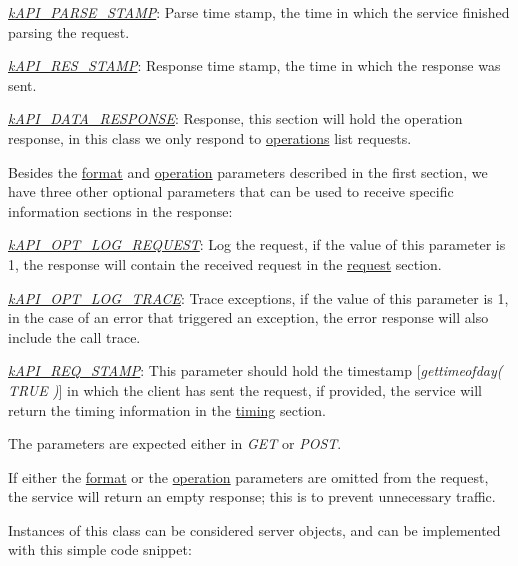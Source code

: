 \begin{DoxyItemize}
\begin{DoxyItemize}
\item {\itshape \hyperlink{}{k\-A\-P\-I\-\_\-\-P\-A\-R\-S\-E\-\_\-\-S\-T\-A\-M\-P}}\-: Parse time stamp, the time in which the service finished parsing the request. 
\item {\itshape \hyperlink{}{k\-A\-P\-I\-\_\-\-R\-E\-S\-\_\-\-S\-T\-A\-M\-P}}\-: Response time stamp, the time in which the response was sent. 
\end{DoxyItemize}
\item {\itshape \hyperlink{}{k\-A\-P\-I\-\_\-\-D\-A\-T\-A\-\_\-\-R\-E\-S\-P\-O\-N\-S\-E}}\-: Response, this section will hold the operation response, in this class we only respond to \hyperlink{}{operations} list requests. 
\end{DoxyItemize}

Besides the \hyperlink{}{format} and \hyperlink{}{operation} parameters described in the first section, we have three other optional parameters that can be used to receive specific information sections in the response\-:


\begin{DoxyItemize}
\item {\itshape \hyperlink{}{k\-A\-P\-I\-\_\-\-O\-P\-T\-\_\-\-L\-O\-G\-\_\-\-R\-E\-Q\-U\-E\-S\-T}}\-: Log the request, if the value of this parameter is 1, the response will contain the received request in the \hyperlink{}{request} section. 
\item {\itshape \hyperlink{}{k\-A\-P\-I\-\_\-\-O\-P\-T\-\_\-\-L\-O\-G\-\_\-\-T\-R\-A\-C\-E}}\-: Trace exceptions, if the value of this parameter is 1, in the case of an error that triggered an exception, the error response will also include the call trace. 
\item {\itshape \hyperlink{}{k\-A\-P\-I\-\_\-\-R\-E\-Q\-\_\-\-S\-T\-A\-M\-P}}\-: This parameter should hold the timestamp \mbox{[}{\itshape gettimeofday( T\-R\-U\-E )}\mbox{]} in which the client has sent the request, if provided, the service will return the timing information in the \hyperlink{}{timing} section. 
\end{DoxyItemize}

The parameters are expected either in {\itshape G\-E\-T} or {\itshape P\-O\-S\-T}.

If either the \hyperlink{}{format} or the \hyperlink{}{operation} parameters are omitted from the request, the service will return an empty response; this is to prevent unnecessary traffic.

Instances of this class can be considered server objects, and can be implemented with this simple code snippet\-:

